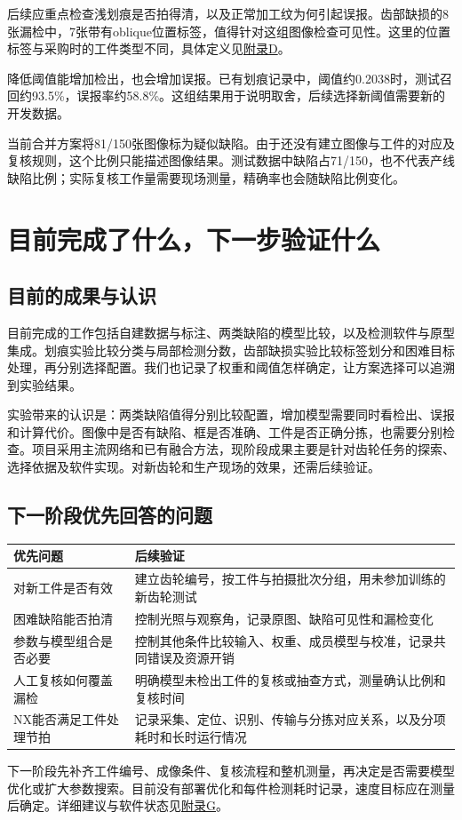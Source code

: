 后续应重点检查浅划痕是否拍得清，以及正常加工纹为何引起误报。齿部缺损的8张漏检中，7张带有oblique位置标签，值得针对这组图像检查可见性。这里的位置标签与采购时的工件类型不同，具体定义见\protect\hyperlink{appendix-d}{附录D}。

降低阈值能增加检出，也会增加误报。已有划痕记录中，阈值约0.2038时，测试召回约93.5\%，误报率约58.8\%。这组结果用于说明取舍，后续选择新阈值需要新的开发数据。

当前合并方案将81/150张图像标为疑似缺陷。由于还没有建立图像与工件的对应及复核规则，这个比例只能描述图像结果。测试数据中缺陷占71/150，也不代表产线缺陷比例；实际复核工作量需要现场测量，精确率也会随缺陷比例变化。\cite{ref3}

\FloatBarrier{}\section{目前完成了什么，下一步验证什么}
\FloatBarrier{}\subsection{目前的成果与认识}
目前完成的工作包括自建数据与标注、两类缺陷的模型比较，以及检测软件与原型集成。划痕实验比较分类与局部检测分数，齿部缺损实验比较标签划分和困难目标处理，再分别选择配置。我们也记录了权重和阈值怎样确定，让方案选择可以追溯到实验结果。

实验带来的认识是：两类缺陷值得分别比较配置，增加模型需要同时看检出、误报和计算代价。图像中是否有缺陷、框是否准确、工件是否正确分拣，也需要分别检查。项目采用主流网络和已有融合方法，现阶段成果主要是针对齿轮任务的探索、选择依据及软件实现。对新齿轮和生产现场的效果，还需后续验证。

\FloatBarrier{}\subsection{下一阶段优先回答的问题}

\par\medskip\noindent\begin{minipage}{\linewidth}\small{}
\begin{tabular}{@{}>{\raggedright\arraybackslash}p{0.380\dimexpr\linewidth-2\tabcolsep\relax}>{\raggedright\arraybackslash}p{0.620\dimexpr\linewidth-2\tabcolsep\relax}@{}}
\toprule
优先问题 & 后续验证 \\
\midrule
对新工件是否有效 & 建立齿轮编号，按工件与拍摄批次分组，用未参加训练的新齿轮测试 \\
困难缺陷能否拍清 & 控制光照与观察角，记录原图、缺陷可见性和漏检变化 \\
参数与模型组合是否必要 & 控制其他条件比较输入、权重、成员模型与校准，记录共同错误及资源开销 \\
人工复核如何覆盖漏检 & 明确模型未检出工件的复核或抽查方式，测量确认比例和复核时间 \\
NX能否满足工件处理节拍 & 记录采集、定位、识别、传输与分拣对应关系，以及分项耗时和长时运行情况 \\
\bottomrule\end{tabular}\end{minipage}\par\medskip

下一阶段先补齐工件编号、成像条件、复核流程和整机测量，再决定是否需要模型优化或扩大参数搜索。目前没有部署优化和每件检测耗时记录，速度目标应在测量后确定。详细建议与软件状态见\protect\hyperlink{appendix-g}{附录G}。


